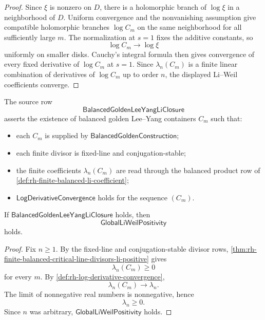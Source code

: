 \begin{proof}
Since $\xi$ is nonzero on $D$, there is a holomorphic branch of
$\log\xi$ in a neighborhood of $D$.  Uniform convergence and the
nonvanishing assumption give compatible holomorphic branches
$\log C_m$ on the same neighborhood for all sufficiently large $m$.
The normalization at $s=1$ fixes the additive constants, so
$$
\log C_m\to\log\xi
$$
uniformly on smaller disks.  Cauchy's integral formula then gives
convergence of every fixed derivative of $\log C_m$ at $s=1$.  Since
$\lambda_n(C_m)$ is a finite linear combination of derivatives of
$\log C_m$ up to order $n$, the displayed Li--Weil coefficients
converge.
\end{proof}

\begin{definition}
\label{def:rh-balanced-golden-lee-yang-li-closure}
The source row
$$
\mathsf{BalancedGoldenLeeYangLiClosure}
$$
asserts the existence of balanced golden Lee--Yang containers $C_m$
such that:

\begin{itemize}
\item each $C_m$ is supplied by
$\mathsf{BalancedGoldenConstruction}$;
\item each finite divisor is fixed-line and conjugation-stable;
\item the finite coefficients $\lambda_n(C_m)$ are read through the
balanced product row of
\autoref{def:rh-finite-balanced-li-coefficient};
\item $\mathsf{LogDerivativeConvergence}$ holds for the sequence
$(C_m)$.
\end{itemize}
\end{definition}

\begin{theorem}
\label{thm:rh-balanced-golden-closure-gives-global-li-positivity}
If $\mathsf{BalancedGoldenLeeYangLiClosure}$ holds, then
$$
\mathsf{GlobalLiWeilPositivity}
$$
holds.
\end{theorem}

\begin{proof}
Fix $n\ge1$.  By the fixed-line and conjugation-stable divisor rows,
\autoref{thm:rh-finite-balanced-critical-line-divisors-li-positive}
gives
$$
\lambda_n(C_m)\ge0
$$
for every $m$.  By
\autoref{def:rh-log-derivative-convergence},
$$
\lambda_n(C_m)\to\lambda_n.
$$
The limit of nonnegative real numbers is nonnegative, hence
$$
\lambda_n\ge0.
$$
Since $n$ was arbitrary, $\mathsf{GlobalLiWeilPositivity}$ holds.
\end{proof}

